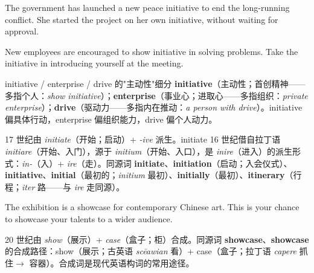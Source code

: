 \documentclass[../main.tex]{subfiles}
\begin{document}

{The government has launched a new peace initiative to end the long-running conflict.}
{She started the project on her own initiative, without waiting for approval.}

{New employees are encouraged to show initiative in solving problems.}
{Take the initiative in introducing yourself at the meeting.}

\begin{gram}{initiative / enterprise / drive 的"主动性"细分}
\textbf{initiative}（主动性；首创精神——多指个人：\textit{show initiative}）；\textbf{enterprise}（事业心；进取心——多指组织：\textit{private enterprise}）；\textbf{drive}（驱动力——多指内在推动：\textit{a person with drive}）。initiative 偏具体行动，enterprise 偏组织能力，drive 偏个人动力。
\end{gram}

\begin{origin}
17 世纪由 \textit{initiate}（开始；启动）+ \textit{-ive} 派生。initiate 16 世纪借自拉丁语 \textit{initiare}（开始、入门），源于 \textit{initium}（开始、入口），是 \textit{inire}（进入）的派生形式：\textit{in-}（入）+ \textit{ire}（走）。同源词 \textbf{initiate}、\textbf{initiation}（启动；入会仪式）、\textbf{initiative}、\textbf{initial}（最初的；\textit{initium} 最初）、\textbf{initially}（最初）、\textbf{itinerary}（行程；\textit{iter} 路——与 \textit{ire} 走同源）。
\end{origin}


{The exhibition is a showcase for contemporary Chinese art.}
{This is your chance to showcase your talents to a wider audience.}


\begin{origin}
20 世纪由 \textit{show}（展示）+ \textit{case}（盒子；柜）合成。同源词 \textbf{showcase}、\textbf{showcase} 的合成路径：show（展示；古英语 \textit{scēawian} 看）+ case（盒子；拉丁语 \textit{capere} 抓住$\to$ 容器）。合成词是现代英语构词的常用途径。
\end{origin}
\end{document}
